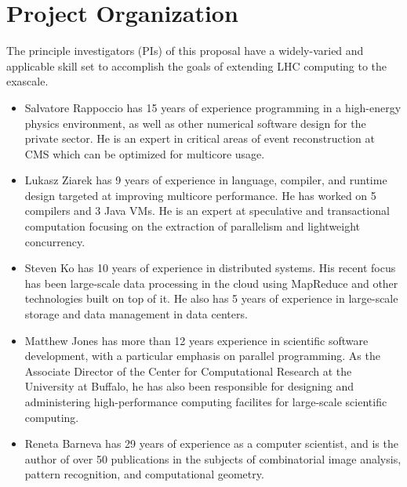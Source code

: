\documentclass[12pt]{article}
\begin{document}
\clearpage

\section{Project Organization}

The principle investigators (PIs) of this proposal have a
widely-varied and applicable skill set to accomplish the goals of
extending LHC computing to the exascale. 

\begin{itemize}
\item Salvatore Rappoccio has 15 years of experience programming in a
high-energy physics environment, as well as other numerical software
design for the private sector. He is an expert in critical
areas of event reconstruction at CMS which can be optimized for
multicore usage. 
\item Lukasz Ziarek has 9 years of experience in language, compiler, and runtime design
targeted at improving multicore performance.  He has worked on 5 compilers and 3 Java VMs. He
is an expert at speculative and transactional computation focusing on the extraction of
parallelism and lightweight concurrency.
\item Steven Ko has 10 years of experience in distributed systems. His recent focus has been large-scale data processing in the cloud using MapReduce and other technologies built on top of it. He also has 5 years of experience in large-scale storage and data management in data centers.
\item Matthew Jones has more than 12 years experience in scientific software development, 
with a particular emphasis on parallel programming.
As the Associate Director of the Center for Computational Research at the University at Buffalo, 
he has also been responsible for designing 
and administering high-performance computing facilites for large-scale
scientific computing.
\item Reneta Barneva has 29 years of experience as a computer
  scientist, and is the author of over 50 publications in the subjects
  of combinatorial image analysis, pattern recognition, and
  computational geometry. 
\end{itemize}
\end{document}
